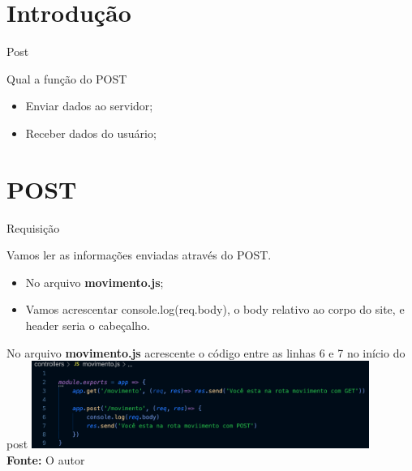 \documentclass{beamer}
\begin{document}
\section{Introdução}
    \begin{frame}[label=lists]{Post}
    \begin{exampleblock}{Qual a função do POST}
        	\begin{itemize}
	\item Enviar dados ao servidor;
	\item Receber dados do usuário;
        	\end{itemize}
      \end{exampleblock}
    \end{frame}
\section{POST}
    \begin{frame}[label=lists]{Requisição}

         Vamos ler as informações enviadas através do POST.
         \begin{itemize}
         \item No arquivo \textbf{movimento.js};
         \item Vamos acrescentar \alert{console.log(req.body)}, o body relativo ao corpo do site, e header seria o cabeçalho.
         \end{itemize}
          \vspace{0.5cm}
          No arquivo \textbf{movimento.js} acrescente o código entre as linhas 6 e 7 no início do post
%
	            \includegraphics[width=110mm]{resources/aula5_1.png}\\
            \tiny{\textbf{Fonte:} O autor}
    \end{frame}
\end{document}
